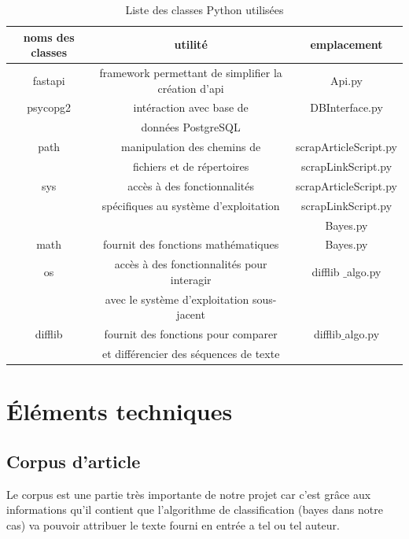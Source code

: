 \documentclass[french,12pt]{article}
\begin{document}
\begin{table}[h]
   \begin{tabular}{| c | c | c |}
      \hline
      \textbf{noms des classes} & \textbf{utilité} & \textbf{emplacement} \\
      \hline
      fastapi & framework permettant de simplifier la création d'api & Api.py\\
      \hline
      psycopg2 & intéraction avec base de & DBInterface.py \\
      & données PostgreSQL & \\
      \hline
      path & manipulation des chemins de  & scrapArticleScript.py \\
      & fichiers et de répertoires & scrapLinkScript.py \\
      \hline
      sys & accès à des fonctionnalités & scrapArticleScript.py \\
      & spécifiques au système d'exploitation & scrapLinkScript.py \\
      & & Bayes.py \\
      \hline
      math & fournit des fonctions mathématiques & Bayes.py \\
      \hline
      os & accès à des fonctionnalités pour interagir & difflib $\_$algo.py \\
      & avec le système d'exploitation sous-jacent & \\
      \hline
      difflib & fournit des fonctions pour comparer  & difflib$\_$algo.py
      \\ & et différencier des séquences de texte & \\
      \hline
   \end{tabular}
   \caption{Liste des classes Python utilisées}
\end{table}

\section{Éléments techniques} \label{elemTech}

\subsection{Corpus d'article}

Le corpus est une partie très importante de notre projet car c'est grâce aux informations qu'il contient que l'algorithme de classification (bayes dans notre cas) va pouvoir attribuer le texte fourni en entrée a tel ou tel auteur.\\
\end{document}
